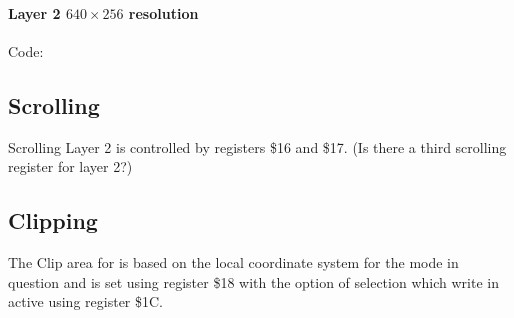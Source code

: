 

\paragraph{Layer 2 $640\times256$ resolution}
Code:



\subsection{Scrolling}
Scrolling Layer 2 is controlled by registers \$16 and \$17. (Is there
a third scrolling register for layer 2?)




\subsection{Clipping}
The Clip area for is based on the local coordinate system for the mode
in question and is set using register \$18 with the option of
selection which write in active using register \$1C.



